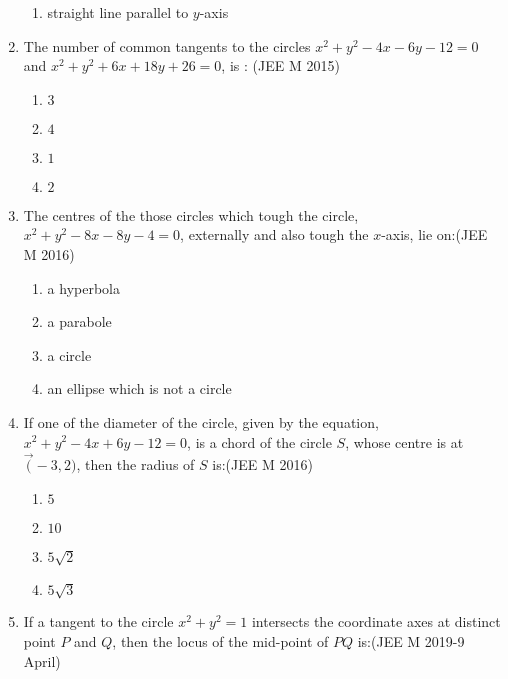 \documentclass[journal,12pt,twocolumn]{IEEEtran}
\theoremstyle{remark}
\begin{document}
\begin{enumerate}
\begin{enumerate}
         \item straight line parallel to $y$-axis\\
    \end{enumerate} 
        \item The number of common tangents to the circles $x^2+y^2-4x-6y-12=0$ and $x^2+y^2+6x+18y+26=0$, is :
         \hfill(JEE M 2015)
    \begin{enumerate}
         \item $3$\\
         \item $4$\\
         \item $1$\\
         \item $2$\\
    \end{enumerate}
         \item The centres of the those circles which tough the circle, $x^2+y^2-8x-8y-4=0$, externally and also tough the $x$-axis, lie on:\hfill(JEE M 2016)
    \begin{enumerate}
        \item a hyperbola\\
        \item a parabole\\
        \item a circle\\
        \item an ellipse which is not a circle\\
    \end{enumerate}
        \item  If one of the diameter of the circle, given by the equation, $x^2+y^2-4x+6y-12=0$, is a chord of the circle $S$, whose centre is at $\vec(-3,2)$, then the radius of $S$ is:\hfill(JEE M 2016)
    \begin{enumerate}
         \item $5$\\
         \item $10$\\
         \item $5\sqrt{2}$\\
         \item $5\sqrt{3}$\\
    \end{enumerate}
        \item If a tangent to the circle $x^2+y^2=1$ intersects the coordinate axes at distinct point $P$ and $Q$, then the locus of the mid-point of $PQ$ is:\hfil(JEE M 2019-9 April)

\end{enumerate}
\end{document}
